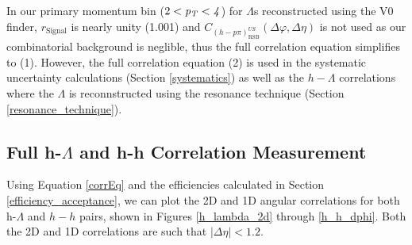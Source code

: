 \documentclass[ALICE,manyauthors]{ALICE_analysis_notes}
\begin{document}
In our primary momentum bin ($2 < \it{p}_{T} < 4$) for $\Lambda$s reconstructed using the V0 finder, $r_{\text{Signal}}$ is nearly unity (1.001) and $C_{(h-p\pi)^{US}_{\text{RSB}}}(\Delta\varphi, \Delta\eta)$ is not used as our combinatorial background is neglible, thus the full correlation equation simplifies to (1). However, the full correlation equation (2) is used in the systematic uncertainty calculations (Section \ref{systematics}) as well as the $h-\Lambda$ correlations where the $\Lambda$ is reconnstructed using the resonance technique  (Section \ref{resonance_technique}).

\subsection{Full h-$\Lambda$ and h-h Correlation Measurement}

Using Equation \ref{corrEq} and the efficiencies calculated in Section \ref{efficiency_acceptance}, we can plot the 2D and 1D angular correlations for both h-$\Lambda$ and $h-h$ pairs, shown in Figures \ref{h_lambda_2d} through \ref{h_h_dphi}. Both the 2D and 1D correlations are such that $|\Delta\eta| < 1.2$.
\end{document}
